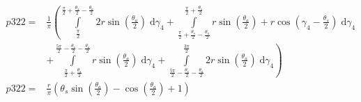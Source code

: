 \begin{align}
    p322 =&\frac{1}{\pi} \left(\int\limits_{\frac{\pi}{2}}^{\frac{\pi}{2} + \frac{\theta_{s}}{2} - \frac{\theta_{a}}{2}}2 r \sin{\left (\frac{\theta_{a}}{2} \right )}\;\mathrm{d}\gamma_{4}+\int\limits_{\frac{\pi}{2} + \frac{\theta_{s}}{2} - \frac{\theta_{a}}{2}}^{\frac{\pi}{2} + \frac{\theta_{s}}{2}}r \sin{\left (\frac{\theta_{a}}{2} \right )} + r \cos{\left (\gamma_{4} - \frac{\theta_{s}}{2} \right )}\;\mathrm{d}\gamma_{4}\right.\\
 &\left.+\int\limits_{\frac{\pi}{2} + \frac{\theta_{s}}{2}}^{\frac{5 \pi}{2} - \frac{\theta_{s}}{2} - \frac{\theta_{a}}{2}}r \sin{\left (\frac{\theta_{a}}{2} \right )}\;\mathrm{d}\gamma_{4}+\int\limits_{\frac{5 \pi}{2} - \frac{\theta_{s}}{2} - \frac{\theta_{a}}{2}}^{\frac{3 \pi}{2}}2 r \sin{\left (\frac{\theta_{a}}{2} \right )}\;\mathrm{d}\gamma_{4}\right)\\
    p322 =& \frac{r}{\pi} \left(\theta_{s} \sin{\left (\frac{\theta_{a}}{2} \right )} - \cos{\left (\frac{\theta_{a}}{2} \right )} + 1\right)
\end{align}